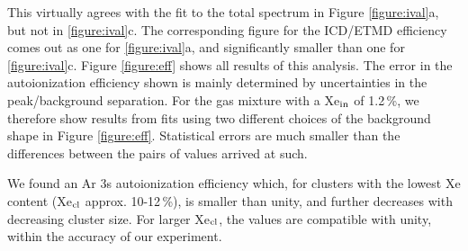 This virtually agrees with the fit to the total spectrum in Figure \ref{figure:ival}a, but not in \ref{figure:ival}c. 
The corresponding figure for the ICD/ETMD efficiency comes out as one for \ref{figure:ival}a, and significantly smaller than one for \ref{figure:ival}c.
Figure \ref{figure:eff} shows all results of this analysis.
The error in the autoionization efficiency shown is mainly determined by uncertainties in the peak/background separation.
For the gas mixture with a Xe$_{\rm in}$ of 1.2\,\%, we therefore show results from fits using two different choices of the background shape in Figure \ref{figure:eff}.
Statistical errors are much smaller than the differences between the pairs of values arrived at such.

We found an Ar 3s autoionization efficiency which, for clusters with the lowest Xe content (Xe$_{\rm cl}$ approx. 10-12\,\%), is smaller than unity, and further decreases with decreasing cluster size. 
For larger Xe$_{\rm cl}$, the values are compatible with unity, within the accuracy of our experiment.

